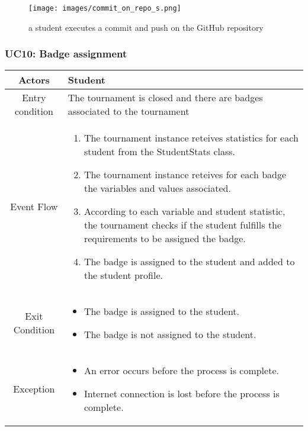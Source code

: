 \documentclass[a4paper, 11pt, titlepage]{article}
\begin{document}
\begin{figure}[h!]
    \centering
    \texttt{[image: images/commit\_on\_repo\_s.png]}
    \caption{a student executes a commit and push on the GitHub repository}
    \label{fig:seq_diag_commit}
    
\end{figure}

\clearpage

\subsubsection*{UC10: Badge assignment}

\begin{center}
    \begin{tabularx}{\linewidth} {|c|X|}
        \hline 
        Actors & Student\\
        \hline 
        Entry condition &
        The tournament is closed and there are badges associated to the tournament\\
        \hline 
        Event Flow &
        \begin{enumerate}
            \item The tournament instance reteives statistics for each student from the StudentStats class.
            \item The tournament instance reteives for each badge the variables and values associated.
            \item According to each variable and student statistic, the tournament checks if the student fulfills the requirements to be assigned the badge.
            \item The badge is assigned to the student and added to the student profile. 
        \end{enumerate}\\
        \hline 
        Exit Condition & 
        \begin{itemize}
            \item The badge is assigned to the student.
            \item The badge is not assigned to the student. 
        \end{itemize}\\
        \hline 
        Exception & 
        \begin{itemize}
            \item An error occurs before the process is complete.
            \item Internet connection is lost before the process is complete.
        \end{itemize}\\
        \hline
    \end{tabularx}
\end{center}
\end{document}
